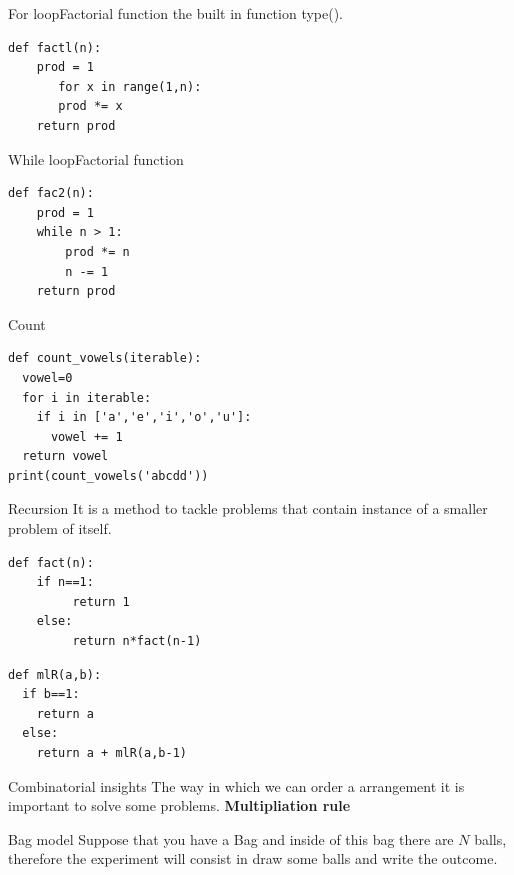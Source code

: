 \documentclass{beamer}
\begin{document}
\begin{frame}[fragile]{For loop}{Factorial function}
the built in function type().
\begin{lstlisting}
def factl(n):
    prod = 1
       for x in range(1,n):
       prod *= x
    return prod
\end{lstlisting}
\end{frame}

\begin{frame}[fragile]{While loop}{Factorial function}
\begin{lstlisting}
def fac2(n):
    prod = 1
    while n > 1:
        prod *= n
        n -= 1
    return prod
\end{lstlisting}
\end{frame}



\begin{frame}[fragile]{Count}
\begin{lstlisting}
def count_vowels(iterable):
  vowel=0
  for i in iterable:
    if i in ['a','e','i','o','u']:
      vowel += 1
  return vowel
print(count_vowels('abcdd'))
\end{lstlisting}
\end{frame}









\begin{frame}[fragile]{Recursion}
It is a method to tackle problems that contain instance of a smaller problem of itself.
\begin{lstlisting}
def fact(n):
    if n==1:
    	 return 1
   	else:
    	 return n*fact(n-1)
\end{lstlisting}


\begin{lstlisting}
def mlR(a,b):
  if b==1:
    return a
  else:
    return a + mlR(a,b-1)
\end{lstlisting}
\end{frame}





\begin{frame}{Combinatorial insights}
The way in which we can order a arrangement it is important to solve some problems.
\textbf{Multipliation rule}

\end{frame}

\begin{frame}{Bag model}
Suppose that you have a Bag and inside of this bag there are $N$ balls, therefore the experiment will consist in draw some balls and write the outcome.

\end{frame}
\end{document}
